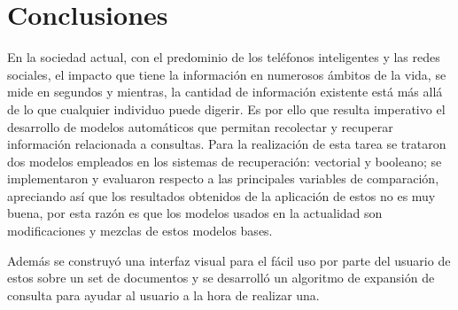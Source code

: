 \documentclass{llncs}
\begin{document}
\section{Conclusiones}

En la sociedad actual, con el predominio de los teléfonos inteligentes y las redes sociales, el impacto que tiene la información en numerosos ámbitos de la vida, se mide en segundos y mientras, la cantidad de información existente está más allá de lo que cualquier individuo puede digerir. Es por ello que resulta imperativo el desarrollo de modelos automáticos que permitan recolectar y recuperar información relacionada a consultas. Para la realización de esta tarea se trataron dos modelos empleados en los sistemas de recuperación: vectorial y booleano; se implementaron y evaluaron respecto a las principales variables de comparación, apreciando así que los resultados obtenidos de la aplicación de estos no es muy buena, por esta razón es que los modelos usados en la actualidad son modificaciones y mezclas de estos modelos bases.

Además se construyó una interfaz visual para el fácil uso por parte del usuario de estos sobre un set de documentos y se desarrolló un algoritmo de expansión de consulta para ayudar al usuario a la hora de realizar una.
\end{document}

